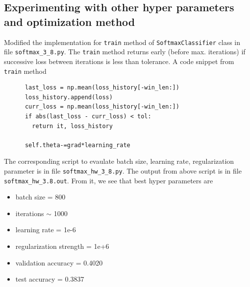\documentclass{article}
\begin{document}
\subsection{Experimenting with other hyper parameters and optimization method}
Modified the implementation for \verb|train| method of \verb|SoftmaxClassifier| class in file \verb|softmax_3_8.py|.
The \verb|train| method returns early (before max. iterations) if successive loss between iterations is less than tolerance.
A code snippet from \verb|train| method
\begin{small}
\begin{lstlisting}
      last_loss = np.mean(loss_history[-win_len:])
      loss_history.append(loss)
      curr_loss = np.mean(loss_history[-win_len:])
      if abs(last_loss - curr_loss) < tol:
        return it, loss_history
        
      self.theta-=grad*learning_rate
\end{lstlisting}
\end{small}
The corresponding script to evaulate batch size, learning rate, regularization parameter is in file \verb|softmax_hw_3_8.py|.
The output from above script is in file \verb|softmax_hw_3.8.out|. From it, we see that best hyper parameters are
\begin{itemize}
	\item batch size = 800
	\item iterations $\sim$ 1000
	\item learning rate = 1e-6
	\item regularization strength = 1e+6
	\item validation accuracy = 0.4020
	\item test accuracy = 0.3837
\end{itemize}
\end{document}
